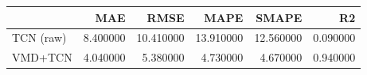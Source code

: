 \begin{tabular}{lrrrrr}
\toprule
 & MAE & RMSE & MAPE & SMAPE & R2 \\
\midrule
TCN (raw) & 8.400000 & 10.410000 & 13.910000 & 12.560000 & 0.090000 \\
VMD+TCN & 4.040000 & 5.380000 & 4.730000 & 4.670000 & 0.940000 \\
\bottomrule
\end{tabular}
